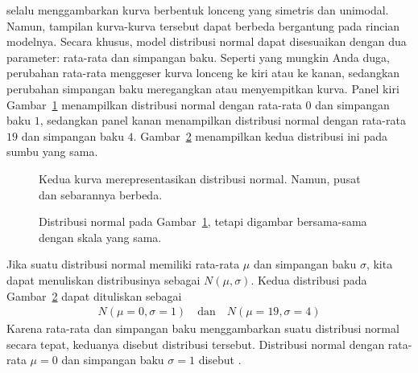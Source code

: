  selalu menggambarkan
kurva berbentuk lonceng yang simetris dan unimodal.
Namun, tampilan kurva-kurva tersebut dapat berbeda bergantung pada
rincian modelnya.
Secara khusus, model distribusi normal dapat disesuaikan dengan
dua parameter: rata-rata dan simpangan baku.
Seperti yang mungkin Anda duga, perubahan rata-rata menggeser
kurva lonceng ke kiri atau ke kanan, sedangkan perubahan simpangan baku
meregangkan atau menyempitkan kurva.
Panel kiri Gambar~\ref{twoSampleNormals} menampilkan distribusi normal
dengan rata-rata $0$ dan simpangan baku $1$, sedangkan panel kanan
menampilkan distribusi normal dengan rata-rata $19$ dan simpangan baku $4$.
Gambar~\ref{twoSampleNormalsStacked} menampilkan kedua distribusi ini
pada sumbu yang sama.

\begin{figure}[h]
  \centering
  \caption{Kedua kurva merepresentasikan distribusi normal.
      Namun, pusat dan sebarannya berbeda.}
  \label{twoSampleNormals}
\end{figure}

\begin{figure}[h]
  \centering
  \caption{Distribusi normal pada
      Gambar~\ref{twoSampleNormals}, tetapi digambar bersama-sama
      dengan skala yang sama.}
  \label{twoSampleNormalsStacked}
\end{figure}

Jika suatu distribusi normal memiliki rata-rata $\mu$ dan simpangan baku
$\sigma$, kita dapat menuliskan distribusinya sebagai $N(\mu, \sigma)$.
Kedua distribusi pada Gambar~\ref{twoSampleNormalsStacked}
dapat dituliskan sebagai
\begin{align*}
N(\mu=0,\sigma=1)
  \quad \text{dan} \quad
  N(\mu=19,\sigma=4)
\end{align*}
Karena rata-rata dan simpangan baku menggambarkan suatu distribusi normal
secara tepat, keduanya disebut
 distribusi tersebut.
Distribusi normal dengan rata-rata $\mu = 0$ dan
simpangan baku $\sigma = 1$ disebut
%
.

